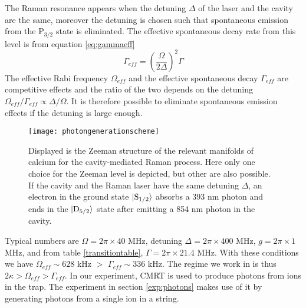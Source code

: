 The Raman resonance appears when the detuning $\Delta$ of the laser and the cavity are the same, moreover the detuning is chosen such that spontaneous emission from the $\text{P}_{3/2}$ state is eliminated. The effective spontaneous decay rate from this level is from equation \eqref{eq:gammaeff}
\begin{equation}
\Gamma_{eff} = \left(\frac{\Omega}{2\Delta}\right)^2\Gamma
\end{equation}
The effective Rabi frequency $\Omega_{eff}$ and the effective spontaneous decay $\Gamma_{eff}$ are competitive effects and the ratio of the two depends on the detuning $\Omega_{eff}/\Gamma_{eff} \propto \Delta/\Omega$. It is therefore possible to eliminate spontaneous emission effects if the detuning is large enough.
\begin{figure}[H]
     \centering
     \texttt{[image: photongenerationscheme]}
    \caption{Displayed is the Zeeman structure of the relevant manifolds of calcium for the cavity-mediated Raman process. Here only one choice for the Zeeman level is depicted, but other are also possible. If the cavity and the Raman laser have the same detuning $\Delta$, an electron in the ground state $\ket{\text{S}_{1/2}}$ absorbs a 393 nm photon and ends in the $\ket{\text{D}_{5/2}}$ state after emitting a 854 nm photon in the cavity.}
      \label{ramanprocess}
\end{figure}

Typical numbers are $\Omega =  2\pi\times 40$ MHz, detuning $\Delta = 2\pi\times 400$ MHz, $g = 2\pi\times 1$ MHz, and from table \ref{transitiontable}, $\Gamma = 2\pi \times 21.4$ MHz. With these conditions we have $\Omega_{eff} \sim 628$ kHz $>$ $\Gamma_{eff} \sim 336$ kHz. The regime we work in is thus $2\kappa>\Omega_{eff}>\Gamma_{eff}$. In our experiment, CMRT is used to produce photons from ions in the trap. The experiment in section \ref{exp:photons} makes use of it by generating photons from a single ion in a string.


